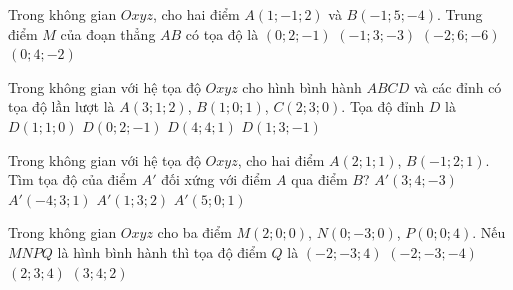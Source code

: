 \begin{ex}%
	Trong  không gian $Oxyz$, cho hai điểm $A(1;-1; 2)$ và $B(-1; 5;-4)$. Trung điểm $M$ của đoạn thẳng $AB$ có tọa độ là
	\choice 
		{\True $(0; 2;-1)$} 
		 {$(-1; 3;-3)$}
		 {$(-2; 6;-6)$}
		 {$(0; 4;-2)$}
\end{ex}

\begin{ex}%
	 Trong không gian với hệ tọa độ $Oxyz$ cho hình bình hành $ABCD$ và các đỉnh có tọa độ lần lượt là $A(3;1;2)$, $B(1;0;1)$, $C(2;3;0)$. Tọa độ đỉnh $D$ là
	\choice 
		 {$D(1;1;0)$}
		{$D(0;2;-1)$} 
		{\True $D(4;4;1)$} 
		 {$D(1;3;-1)$}
\end{ex}

\begin{ex}%
	Trong không gian với hệ tọa độ $Oxyz$, cho  hai điểm $A(2;1;1)$, $B(-1;2;1)$. Tìm tọa độ của điểm $A'$ đối xứng với điểm $A$ qua điểm $B$?
	 \choice
		 {$A'(3;4;-3)$}
		{\True  $A'(-4;3;1)$}
		{$A'(1;3;2)$} 
		{$A'(5;0;1)$} 
\end{ex}

\begin{ex}%
	Trong không gian $Oxyz$ cho ba điểm $M(2;0;0)$, $N(0;-3;0)$, $P(0;0;4)$.  Nếu $MNPQ$ là hình bình hành thì tọa độ điểm $Q$ là
	\choice 
		{$(-2;-3;4)$} 
		{$(-2;-3;-4)$} 
		{\True $(2;3;4)$} 
		{$(3;4;2)$} 
\end{ex}

